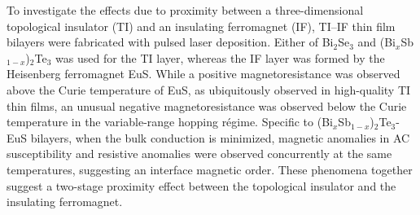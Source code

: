 To investigate the effects due to proximity between a three-dimensional topological insulator (TI) and an insulating ferromagnet (IF), TI--IF thin film bilayers were fabricated with pulsed laser deposition. Either of Bi$_2$Se$_3$ and (Bi$_x$Sb$_{1-x}$)$_2$Te$_3$ was used for the TI layer, whereas the IF layer was formed by the Heisenberg ferromagnet EuS. While a positive magnetoresistance was observed above the Curie temperature of EuS, as ubiquitously observed in high-quality TI thin films, an unusual negative magnetoresistance was observed below the Curie temperature in the variable-range hopping r\'egime. Specific to (Bi$_x$Sb$_{1-x}$)$_2$Te$_3$-EuS bilayers, when the bulk conduction is minimized, magnetic anomalies in AC susceptibility and resistive anomalies were observed concurrently at the same temperatures, suggesting an interface magnetic order. These phenomena together suggest a two-stage proximity effect between the topological insulator and the insulating ferromagnet.